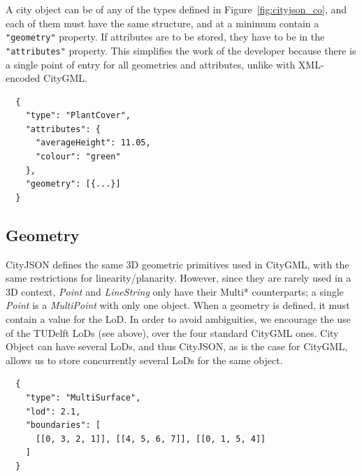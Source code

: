 %

A city object can be of any of the types defined in Figure~\ref{fig:cityjson_co}, and each of them must have the same structure, and at a minimum contain a \texttt{"geometry"} property. 
If attributes are to be stored, they have to be in the \texttt{"attributes"} property.
This simplifies the work of the developer because there is a single point of entry for all geometries and attributes, unlike with XML-encoded CityGML\@.
\begin{lstlisting}
  {
    "type": "PlantCover",
    "attributes": {
      "averageHeight": 11.05,
      "colour": "green"
    },
    "geometry": [{...}]
  }
\end{lstlisting}


\subsection{Geometry}

CityJSON defines the same 3D geometric primitives used in CityGML, with the same restrictions for linearity/planarity.
However, since they are rarely used in a 3D context, \emph{Point} and \emph{LineString} only have their Multi* counterparts; a single \emph{Point} is a \emph{MultiPoint} with only one object.
When a geometry is defined, it must contain a value for the LoD. 
In order to avoid ambiguities, we encourage the use of the TUDelft LoDs (see above), over the four standard CityGML ones.
City Object can have several LoDs, and thus CityJSON, as is the case for CityGML, allows us to store concurrently several LoDs for the same object.
\begin{lstlisting}
  {
    "type": "MultiSurface",
    "lod": 2.1,
    "boundaries": [
      [[0, 3, 2, 1]], [[4, 5, 6, 7]], [[0, 1, 5, 4]]
    ]
  }
\end{lstlisting}

